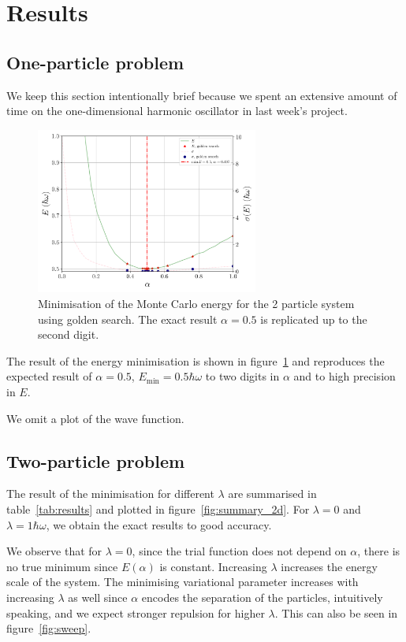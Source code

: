 \documentclass[a4paper,DIV=12,english]{scrartcl}
\begin{document}
\FloatBarrier
\section{Results}
\subsection{One-particle problem}
We keep this section intentionally brief because we spent an extensive amount of time on the one-dimensional harmonic oscillator in last week's project.
\begin{figure}
    \centering
    \includegraphics[width=0.65\textwidth]{../plots/summary/summary_1d.pdf}
    \caption{Minimisation of the Monte Carlo energy for the 2 particle system using golden search. The exact result $\alpha=0.5$ is replicated up to the second digit.}
    \label{fig:summary1sd}
\end{figure}
The result of the energy minimisation is shown in figure~\ref{fig:summary1sd} and reproduces the expected result of $\alpha=0.5$, $E_\text{min}=0.5\hbar\omega$ to two digits in $\alpha$ and to high precision in $E$.

We omit a plot of the wave function.

\FloatBarrier
\subsection{Two-particle problem}
The result of the minimisation for different $\lambda$ are summarised in table~\ref{tab:results} and plotted in figure~\ref{fig:summary_2d}. For $\lambda=0$ and $\lambda=1\hbar\omega$, we obtain the exact results to good accuracy.

We observe that for $\lambda=0$, since the trial function does not depend on $\alpha$, there is no true minimum since $E(\alpha)$ is constant. Increasing $\lambda$ increases the energy scale of the system. The minimising variational parameter increases with increasing $\lambda$ as well since $\alpha$ encodes the separation of the particles, intuitively speaking, and we expect stronger repulsion for higher $\lambda$. This can also be seen in figure~\ref{fig:sweep}.
\end{document}
